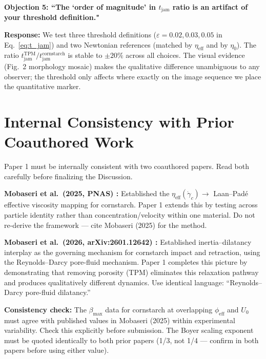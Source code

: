 \documentclass[11pt,letterpaper]{article}
\newcommand{\phieff}{\phi_{\mathrm{eff}}}
\newcommand{\tjam}{t_{\mathrm{jam}}}
\newcommand{\etaeff}{\eta_{\mathrm{eff}}}
\newcommand{\gamcrit}{\dot{\gamma}_c}
\newcommand{\betamax}{\beta_{\max}}
\begin{document}
\begin{reviewbox}
\textbf{Objection 5: ``The `order of magnitude' in $\tjam$ ratio is an artifact
of your threshold definition."}

\textbf{Response:}
We test three threshold definitions ($\varepsilon = 0.02, 0.03, 0.05$ in
Eq.~\eqref{eq:t_jam}) and two Newtonian references (matched by $\etaeff$ and
by $\eta_0$). The ratio
$\tjam^\mathrm{TPM}/\tjam^\mathrm{cornstarch}$ is stable to $\pm 20\%$
across all choices. The visual evidence (Fig.~2 morphology mosaic) makes the
qualitative difference unambiguous to any observer; the threshold only
affects where exactly on the image sequence we place the quantitative marker.
\end{reviewbox}

\section{Internal Consistency with Prior Coauthored Work}

\begin{cautionbox}
Paper 1 must be internally consistent with two coauthored papers. Read both
carefully before finalizing the Discussion.
\end{cautionbox}

\textbf{Mobaseri et al.\ (2025, PNAS) \cite{Mobaseri2025}:}
Established the $\etaeff(\gamcrit) \to$ Laan--Padé effective viscosity
mapping for cornstarch. Paper 1 extends this by testing across particle
identity rather than concentration/velocity within one material. Do not
re-derive the framework --- cite Mobaseri (2025) for the method.

\textbf{Mobaseri et al.\ (2026, arXiv:2601.12642) \cite{Mobaseri2026}:}
Established inertia--dilatancy interplay as the governing mechanism for
cornstarch impact and retraction, using the Reynolds--Darcy pore-fluid
mechanism. Paper 1 completes this picture by demonstrating that removing
porosity (TPM) eliminates this relaxation pathway and produces
qualitatively different dynamics. Use identical language: ``Reynolds--Darcy
pore-fluid dilatancy.''

\begin{cautionbox}
\textbf{Consistency check:} The $\betamax$ data for cornstarch at overlapping
$\phieff$ and $U_0$ must agree with published values in Mobaseri (2025)
within experimental variability. Check this explicitly before submission.
The Boyer scaling exponent must be quoted identically to both prior papers
(1/3, not 1/4 --- confirm in both papers before using either value).
\end{cautionbox}
\end{document}

